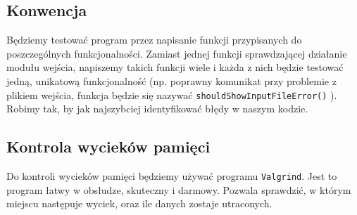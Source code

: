 \documentclass[a4paper,12pt]{article}
\begin{document}
\subsection{Konwencja}
Będziemy testować program przez napisanie funkcji przypisanych do poszczególnych funkcjonalności. Zamiast jednej funkcji sprawdzającej działanie modułu wejścia, napiszemy takich funkcji wiele i każda z nich będzie testować jedną, unikatową funkcjonalność (np. poprawny komunikat przy problemie z plikiem wejścia, funkcja będzie się nazywać \texttt{shouldShowInputFileError()} ). Robimy tak, by jak najszybciej identyfikować błędy w naszym kodzie.

\subsection{Kontrola wycieków pamięci}
Do kontroli wycieków pamięci będziemy używać programu \texttt{Valgrind}. Jest to program łatwy w obsłudze, skuteczny i darmowy. Pozwala sprawdzić, w którym miejscu następuje wyciek, oraz ile danych zostaje utraconych.
\end{document}
